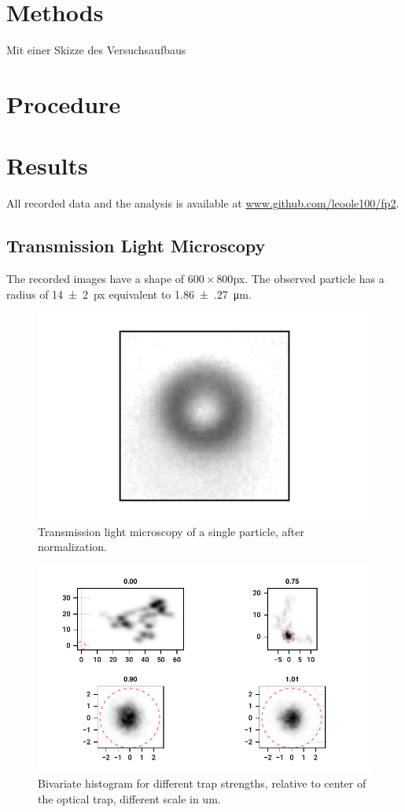 \documentclass[
    parskip=half, 
    twoside=false,
    twocolumn=true,
    fontsize=11pt,
]{scrarticle}
\begin{document}
\section{Methods}
Mit einer Skizze des Versuchsaufbaus

\section{Procedure}

\pagebreak
\section{Results}
All recorded data and the analysis is available at \url{www.github.com/leoole100/fp2}.

\subsection{Transmission Light Microscopy}
The recorded images have a shape of $600\times 800$\si{px}.
The observed particle has a radius of \SI{14(2)}{px} equivalent to \SI{1.86(27)}{\micro m}. 
\begin{figure}[h]
    \centering
    \includegraphics{figures/01_01_1_particle.pdf}
    \caption{Transmission light microscopy of a single particle, after normalization.}
\end{figure}

\begin{figure}[h]
    \centering
    \includegraphics{figures/01_03_1_bivariate.pdf}
    \caption{Bivariate histogram for different trap strengths, relative to center of the optical trap, different scale in um.}
\end{figure}
\end{document}
